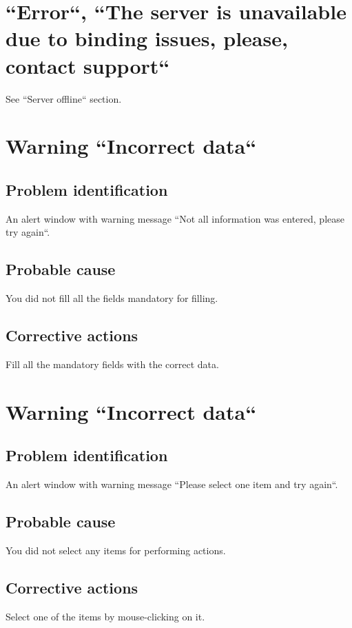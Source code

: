\section{``Error``, ``The server is unavailable due to binding issues,
please, contact support``}

See ``Server offline`` section.

\section{Warning ``Incorrect data``}

\subsection{Problem identification}
An alert window with warning message ``Not all information was entered,
please try again``.

\subsection{Probable cause}
You did not fill all the fields mandatory for filling.
 
\subsection{Corrective actions}
Fill all the mandatory fields with the correct data.

\section{Warning ``Incorrect data``}

\subsection{Problem identification}
An alert window with warning message ``Please select one item and try again``.

\subsection{Probable cause}
You did not select any items for performing actions.
 
\subsection{Corrective actions}
Select one of the items by mouse-clicking on it.